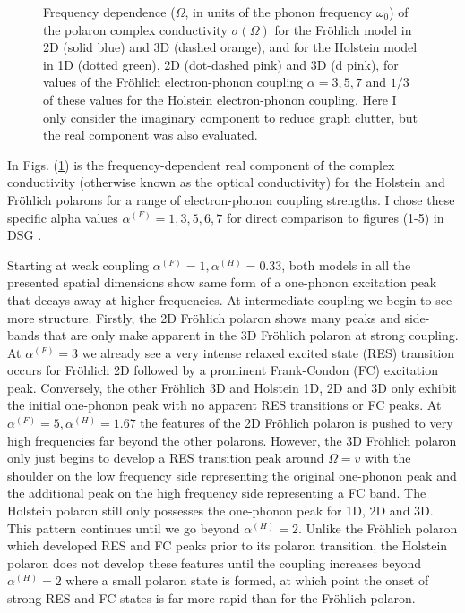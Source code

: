 \begin{figure}[!tbp]
    \caption{Frequency dependence ($\Omega$, in units of the phonon frequency $\omega_0$) of the polaron complex conductivity $\sigma(\Omega)$ for the Fr\"ohlich model in 2D (solid blue) and 3D (dashed orange), and for the Holstein model in 1D (dotted green), 2D (dot-dashed pink) and 3D (d pink), for values of the Fr\"ohlich electron-phonon coupling $\alpha = 3, 5, 7$ and $1/3$ of these values for the Holstein electron-phonon coupling. Here I only consider the imaginary component to reduce graph clutter, but the real component was also evaluated.}
    \label{fig:re_con_freq}
\end{figure}

In Figs. (\ref{fig:re_con_freq}) is the frequency-dependent real component of the complex conductivity (otherwise known as the optical conductivity) for the Holstein and Fr\"ohlich polarons for a range of electron-phonon coupling strengths. I chose these specific alpha values $\alpha^{(F)} = 1, 3, 5, 6, 7$ for direct comparison to figures (1-5) in DSG \cite{Devreese1972}.
\newline

Starting at weak coupling $\alpha^{(F)} = 1, \alpha^{(H)} = 0.33$, both models in all the presented spatial dimensions show same form of a one-phonon excitation peak that decays away at higher frequencies. At intermediate coupling we begin to see more structure. Firstly, the 2D Fr\"ohlich polaron shows many peaks and side-bands that are only make apparent in the 3D Fr\"ohlich polaron at strong coupling. At $\alpha^{(F)} = 3$ we already see a very intense relaxed excited state (RES) transition occurs for Fr\"ohlich 2D followed by a prominent Frank-Condon (FC) excitation peak. Conversely, the other Fr\"ohlich 3D and Holstein 1D, 2D and 3D only exhibit the initial one-phonon peak with no apparent RES transitions or FC peaks. At $\alpha^{(F)} = 5, \alpha^{(H)} = 1.67$ the features of the 2D Fr\"ohlich polaron is pushed to very high frequencies far beyond the other polarons. However, the 3D Fr\"ohlich polaron only just begins to develop a RES transition peak around $\Omega = v$ with the shoulder on the low frequency side representing the original one-phonon peak and the additional peak on the high frequency side representing a FC band. The Holstein polaron still only possesses the one-phonon peak for 1D, 2D and 3D. This pattern continues until we go beyond $\alpha^{(H)} = 2$. Unlike the Fr\"ohlich polaron which developed RES and FC peaks prior to its polaron transition, the Holstein polaron does not develop these features until the coupling increases beyond $\alpha^{(H)} = 2$ where a small polaron state is formed, at which point the onset of strong RES and FC states is far more rapid than for the Fr\"ohlich polaron. 

